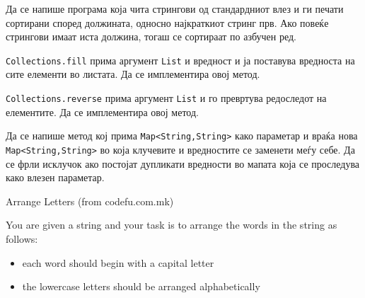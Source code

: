 

\lfoot{}
\cfoot{\thepage}
\rfoot{}
\usepackage{fancyvrb}
\usepackage{xcolor}
\usepackage{textcomp}


\begin{questions}


\renewcommand{\theenumi}{\alph{enumi}}

\question

Да се напише програма која чита стрингови од стандардниот влез и ги печати
сортирани според должината, односно најкраткиот стринг прв. Ако повеќе стрингови
имаат иста должина, тогаш се сортираат по азбучен ред.



\question

\texttt{Collections.fill} прима аргумент \texttt{List} и вредност и ја поставува
вредноста на сите елементи во листата. Да се имплементира овој метод.



\question

\texttt{Collections.reverse} прима аргумент \texttt{List} и го превртува
редоследот на елементите. Да се имплементира овој метод.



\question

Да се напише метод кој прима \texttt{Map<String,String>} како параметар и враќа
нова \texttt{Map<String,String>} во која клучевите и вредностите се заменети
меѓу себе. Да се фрли исклучок ако постојат дупликати вредности во мапата
која се проследува како влезен параметар.




\question

Arrange Letters (from codefu.com.mk)

You are given a string and your task is to arrange the words in the string as follows:
\begin{itemize}
  \item each word should begin with a capital letter
  \item the lowercase letters should be arranged alphabetically  
\end{itemize}


\end{questions}
